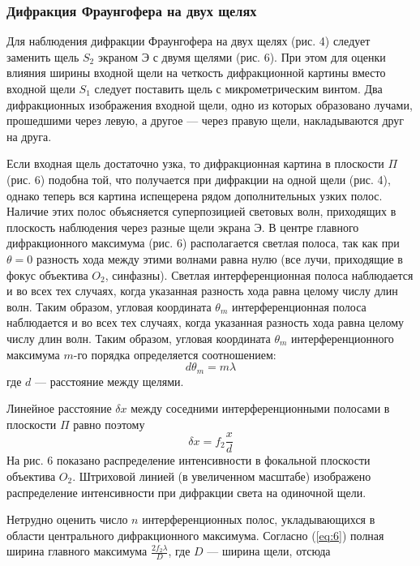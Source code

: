 \documentclass[a4paper, 12pt]{article}
\begin{document}
	\subsubsection{Дифракция Фраунгофера на двух щелях}
	Для наблюдения дифракции Фраунгофера на двух щелях (рис. 4) следует заменить щель $S_2$ экраном $\text{Э}$ с двумя щелями (рис. 6). При этом для оценки влияния ширины входной щели на четкость дифракционной картины вместо входной щели $S_1$ следует поставить щель с микрометрическим винтом. Два дифракционных изображения входной щели, одно из которых образовано лучами, прошедшими через левую, а другое — через правую щели, накладываются друг на друга.\par
	Если входная щель достаточно узка, то дифракционная картина в плоскости $\Pi$ (рис. 6) подобна той, что получается при дифракции на одной щели (рис. 4), однако теперь вся картина испещерена рядом дополнительных узких полос. Наличие этих полос объясняется суперпозицией световых волн, приходящих в плоскость наблюдения через разные щели экрана $\text{Э}$. В центре главного дифракционного максимума (рис. 6) располагается светлая полоса, так как при $\theta=0$ разность хода между этими волнами равна нулю (все лучи, приходящие в фокус объектива $O_2$, синфазны). Светлая интерференционная полоса наблюдается и во всех тех случаях, когда указанная разность хода равна целому числу длин волн. Таким образом, угловая координата $\theta_m$ интерференционная полоса наблюдается и во всех тех случаях, когда указанная разность хода равна целому числу длин волн. Таким образом, угловая координата $\theta_m$ интерференционного максимума $m$-го порядка определяется соотношением:
	\begin{equation}
		d\theta_m=m\lambda
	\end{equation}
	где $d$ — расстояние между щелями.\par
	Линейное расстояние $\delta x$ между соседними интерференционными полосами в плоскости $\Pi$ равно поэтому
	\begin{equation}
		\delta x=f_2\frac{x}{d}
	\end{equation}
	На рис. 6 показано распределение интенсивности в фокальной плоскости объектива $O_2$. Штриховой линией (в увеличенном масштабе) изображено распределение интенсивности при дифракции света на одиночной щели.\par
	Нетрудно оценить число $n$ интерференционных полос, укладывающихся в области центрального дифракционного максимума. Согласно (\ref{eq:6}) полная ширина главного максимума $\frac{2 f_2\lambda}{D}$, где $D$ — ширина щели, отсюда
\end{document}

